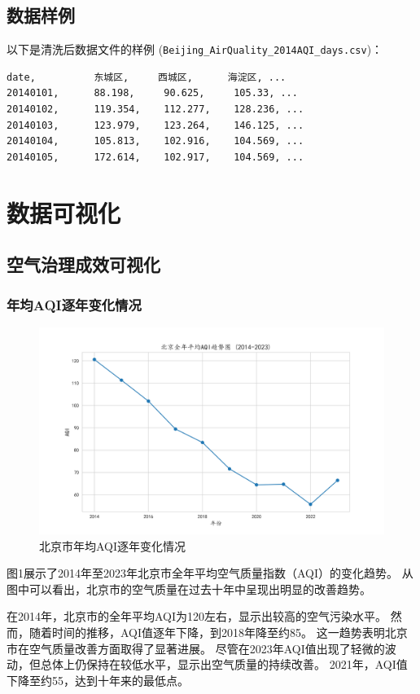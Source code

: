 \documentclass[12pt, a4paper, oneside]{ctexart}
\begin{document}
\subsection{数据样例}  
以下是清洗后数据文件的样例 (\texttt{Beijing\_AirQuality\_2014AQI\_days.csv})：  

\begin{verbatim}
date,          东城区,     西城区,      海淀区, ...
20140101,      88.198,     90.625,     105.33, ...
20140102,      119.354,    112.277,    128.236, ...
20140103,      123.979,    123.264,    146.125, ...
20140104,      105.813,    102.916,    104.569, ...
20140105,      172.614,    102.917,    104.569, ...
\end{verbatim}

\newpage
\section{数据可视化}
\subsection{空气治理成效可视化}
\subsubsection{年均AQI逐年变化情况}
\begin{figure}[htb]
    \centering
    \includegraphics[width=\textwidth]{Outputs/北京全年平均AQI趋势图 (2014-2023).png}
    \caption{北京市年均AQI逐年变化情况}
    \label{fig:AQI_yearly}
\end{figure}
图1展示了2014年至2023年北京市全年平均空气质量指数（AQI）的变化趋势。
从图中可以看出，北京市的空气质量在过去十年中呈现出明显的改善趋势。

在2014年，北京市的全年平均AQI为120左右，显示出较高的空气污染水平。
然而，随着时间的推移，AQI值逐年下降，到2018年降至约85。
这一趋势表明北京市在空气质量改善方面取得了显著进展。
尽管在2023年AQI值出现了轻微的波动，但总体上仍保持在较低水平，显示出空气质量的持续改善。
2021年，AQI值下降至约55，达到十年来的最低点。
\end{document}

